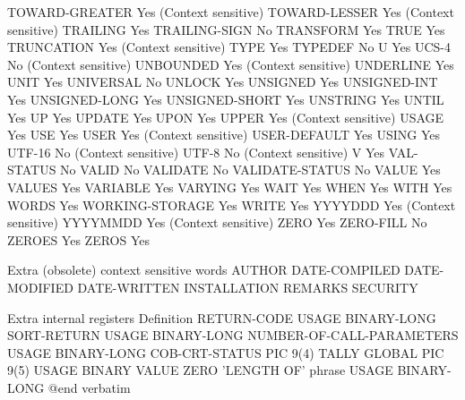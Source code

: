 TOWARD-GREATER                  Yes (Context sensitive)
TOWARD-LESSER                   Yes (Context sensitive)
TRAILING                        Yes
TRAILING-SIGN                   No
TRANSFORM                       Yes
TRUE                            Yes
TRUNCATION                      Yes (Context sensitive)
TYPE                            Yes
TYPEDEF                         No
U                               Yes
UCS-4                           No (Context sensitive)
UNBOUNDED                       Yes (Context sensitive)
UNDERLINE                       Yes
UNIT                            Yes
UNIVERSAL                       No
UNLOCK                          Yes
UNSIGNED                        Yes
UNSIGNED-INT                    Yes
UNSIGNED-LONG                   Yes
UNSIGNED-SHORT                  Yes
UNSTRING                        Yes
UNTIL                           Yes
UP                              Yes
UPDATE                          Yes
UPON                            Yes
UPPER                           Yes (Context sensitive)
USAGE                           Yes
USE                             Yes
USER                            Yes (Context sensitive)
USER-DEFAULT                    Yes
USING                           Yes
UTF-16                          No (Context sensitive)
UTF-8                           No (Context sensitive)
V                               Yes
VAL-STATUS                      No
VALID                           No
VALIDATE                        No
VALIDATE-STATUS                 No
VALUE                           Yes
VALUES                          Yes
VARIABLE                        Yes
VARYING                         Yes
WAIT                            Yes
WHEN                            Yes
WITH                            Yes
WORDS                           Yes
WORKING-STORAGE                 Yes
WRITE                           Yes
YYYYDDD                         Yes (Context sensitive)
YYYYMMDD                        Yes (Context sensitive)
ZERO                            Yes
ZERO-FILL                       No
ZEROES                          Yes
ZEROS                           Yes

Extra (obsolete) context sensitive words
AUTHOR
DATE-COMPILED
DATE-MODIFIED
DATE-WRITTEN
INSTALLATION
REMARKS
SECURITY

Extra internal registers        Definition
RETURN-CODE                     USAGE BINARY-LONG
SORT-RETURN                     USAGE BINARY-LONG
NUMBER-OF-CALL-PARAMETERS       USAGE BINARY-LONG
COB-CRT-STATUS                  PIC 9(4)
TALLY                           GLOBAL PIC 9(5) USAGE BINARY VALUE ZERO
'LENGTH OF' phrase              USAGE BINARY-LONG
@end verbatim

